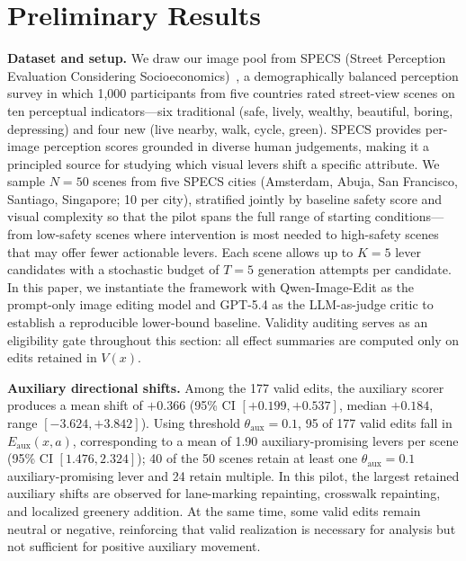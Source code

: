 \section{Preliminary Results}
\label{sec:results}

\noindent\textbf{Dataset and setup.}
We draw our image pool from SPECS (Street Perception Evaluation
Considering Socioeconomics)~\cite{quintana2025}, a demographically
balanced perception survey in which 1{,}000 participants from five
countries rated street-view scenes on ten perceptual indicators---six
traditional (safe, lively, wealthy, beautiful, boring, depressing) and
four new (live nearby, walk, cycle, green).
SPECS provides per-image perception scores grounded in diverse human
judgements, making it a principled source for studying which visual
levers shift a specific attribute.
We sample $N{=}50$ scenes from five SPECS cities (Amsterdam, Abuja,
San Francisco, Santiago, Singapore; 10 per city), stratified jointly by
baseline safety score and visual complexity so that the pilot spans the
full range of starting conditions---from low-safety scenes where
intervention is most needed to high-safety scenes that may offer fewer
actionable levers.
Each scene allows up to $K{=}5$ lever candidates with a stochastic
budget of $T{=}5$ generation attempts per candidate. In this paper, we
instantiate the framework with Qwen-Image-Edit as the prompt-only
image editing model and GPT-5.4 as the LLM-as-judge critic to
establish a reproducible lower-bound baseline.
Validity auditing serves as an eligibility gate throughout this section:
all effect summaries are computed only on edits retained in $V(x)$.

\noindent\textbf{Auxiliary directional shifts.}
Among the 177 valid edits, the auxiliary scorer produces a mean shift of
$+0.366$ (95\% CI $[+0.199, +0.537]$, median $+0.184$, range
$[-3.624, +3.842]$). Using threshold $\theta_{\mathrm{aux}}{=}0.1$,
95 of 177 valid edits fall in $E_{\mathrm{aux}}(x,a)$, corresponding to
a mean of 1.90 auxiliary-promising levers per scene
(95\% CI $[1.476, 2.324]$); 40 of the 50 scenes retain at least one
$\theta_{\mathrm{aux}}{=}0.1$ auxiliary-promising lever and 24 retain multiple.
In this pilot, the largest retained auxiliary shifts are observed for
lane-marking repainting, crosswalk repainting, and localized greenery
addition.
At the same time, some valid edits remain neutral or negative, reinforcing that
valid realization is necessary for analysis but not sufficient for
positive auxiliary movement.

